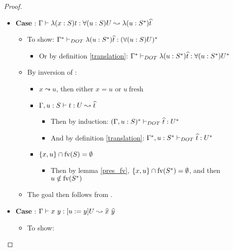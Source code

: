 \begin{proof}
\begin{itemize}
\begin{itemize}
        \end{itemize}
        \item \textbf{Case} : $\Gamma \vdash \lambda(x:S)t: \forall(u:S)U \leadsto \lambda(u:S^{*})\widehat{t}$
        \begin{itemize}
            \item To show: $\Gamma^{*} \vdash_{DOT} \lambda(u:S^{*})\widehat{t}: (\forall(u:S)U)^{*}$
            \begin{itemize}
                \item Or by definition \ref{translation}:
                    $\Gamma^{*} \vdash_{DOT} \lambda(u:S^{*})\widehat{t}: \forall(u:S^{*})U^{*}$
            \end{itemize}
            \item By inversion of :
            \begin{itemize}
                \item $x \leadsto u$, then either $x = u$ or $u\ \text{fresh}$
                \item $\Gamma, u: S \vdash t: U \leadsto \widehat{t}$
                \begin{itemize}
                    \item Then by induction:
                        $(\Gamma, u: S)^{*} \vdash_{DOT} \widehat{t}: {U}^{*}$
                    \item And by definition \ref{translation}:
                        $\Gamma^{*}, u: S^{*} \vdash_{DOT} \widehat{t}: {U}^{*}$
                \end{itemize}
                \item $\{x, u\} \cap \text{fv}(S) = \emptyset$
                \begin{itemize}
                    \item Then by lemma \ref{pres_fv},
                        $\{x, u\} \cap \text{fv}(S^{*}) = \emptyset$, and then $u
                        \notin \text{fv}(S^{*})$
                \end{itemize}
            \end{itemize}
            \item The goal then follows from .
        \end{itemize}
        \item \textbf{Case} :
            $\TJ{\Gamma}{x\ y}{\SUB{u}{y}U}{\HAT{x}\ \HAT{y}}$
        \begin{itemize}
            \item To show:

\end{itemize}
\end{itemize}
\end{proof}

